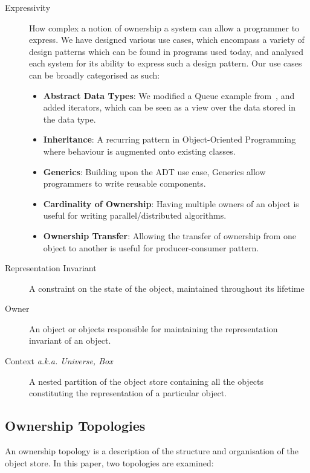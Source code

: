 \documentclass{acm_proc_article-sp}
\begin{document}
\begin{description}
	\item[Expressivity] How complex a notion of ownership a system can allow a
	programmer to express. We have designed various use cases, which encompass
	a variety of design patterns which can be found in programs used today, and
	analysed each system for its ability to express such a design pattern. Our
	use cases can be broadly categorised as such:

	\begin{itemize}
		\item \textbf{Abstract Data Types}: We modified a Queue example
		from~\cite{boyapati04safejava}, and added iterators, which can be seen
		as a view over the data stored in the data type.
		\item \textbf{Inheritance}: A recurring pattern in Object-Ori\-ented
		Programming where behaviour is augme\-nted onto existing classes.
		\item \textbf{Generics}: Building upon the ADT use case, Gen\-erics
		allow programmers to write reusable components.
		\item \textbf{Cardinality of Ownership}: Having multiple owners of an
		object is useful for writing parallel/distributed algorithms.
		\item \textbf{Ownership Transfer}: Allowing the transfer of ownership
		from
		one object to another is useful for producer-consumer pattern.

	\end{itemize}

	\item[Representation Invariant] A constraint on the state of the object,
	maintained throughout its lifetime
	\item[Owner] An object or objects responsible for maintaining  the
	representation invariant of an object.
	\item[Context \emph{a.k.a. Universe, Box}] A nested partition of the object
	store containing all the objects constituting the representation of
	a particular object.

\end{description}

\subsection{Ownership Topologies}
\label{subsec:topologies}

An ownership topology is a description of the structure and organisation of the
object store. In this paper, two topologies are examined:
\end{document}
